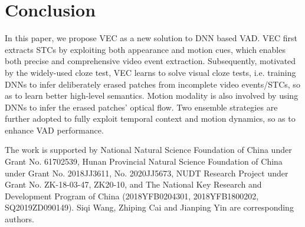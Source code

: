 \documentclass[sigconf]{acmart}
\begin{document}
\section{Conclusion}
\label{sec:conclusion}
In this paper, we propose VEC as a new solution to DNN based VAD. VEC first extracts STCs by exploiting both appearance and motion cues, which enables both precise and comprehensive video event extraction. Subsequently, motivated by the widely-used cloze test, VEC learns to solve visual cloze tests, i.e. training DNNs to infer deliberately erased patches from incomplete video events/STCs, so as to learn better high-level semantics. Motion modality is also involved by using DNNs to infer the erased patches' optical flow. Two ensemble strategies are further adopted to fully exploit temporal context and motion dynamics, so as to enhance VAD performance.

\begin{acks}	
The work is supported by National Natural Science Foundation of China under Grant No. 61702539, Hunan Provincial Natural Science Foundation of China under Grant No. 2018JJ3611, No. 2020JJ5673, NUDT Research Project under Grant No. ZK-18-03-47, ZK20-10, and The National Key Research and Development Program of China (2018YFB0204301, 2018YFB1800202, SQ2019ZD090149). Siqi Wang, Zhiping Cai and Jianping Yin are corresponding authors.
\end{acks}


\end{document}
